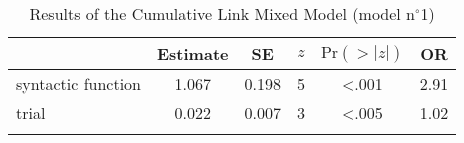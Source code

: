 \begin{table}[ht]
\centering
\begin{tabular}{l S[table-format=1.3] S[table-format=1.3] c S[table-format=<1.3] S[table-format=1.2]}
  \lsptoprule
 & {Estimate} & {SE} & {$z$} & {$\text{Pr}(>|z|)$} & {OR} \\ 
  \midrule
  syntactic function & 1.067 & 0.198 & 5 & <.001 & 2.91 \\ 
  trial              & 0.022 & 0.007 & 3 & <.005 & 1.02 \\ 
   \lspbottomrule
\end{tabular}
\caption{Results of the Cumulative Link Mixed Model (model n$^{\circ}$1)}
\label{tab:exp10-m1}
\end{table}
